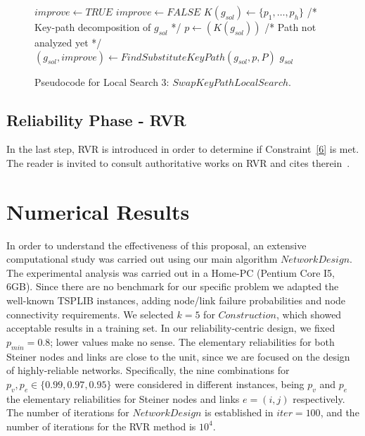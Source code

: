 \documentclass{llncs}
\begin{document}
\begin{figure}[H]
\begin{algorithm}[H]
\caption{$g_{sol} = SwapKeyPathLocalSearch(G_B,C,g_{sol},P)$}
\begin{algorithmic}[1]
\STATE $improve \leftarrow TRUE$
\STATE $improve \leftarrow FALSE$
\STATE $K(g_{sol}) \leftarrow \{p_1,\ldots,p_h\}$ /* Key-path decomposition of $g_{sol}$ */
\STATE $p \leftarrow(K(g_{sol}))$ /* Path not analyzed yet */
\STATE $(g_{sol},improve) \leftarrow FindSubstituteKeyPath(g_{sol},p,P)$
\ENDWHILE
\ENDWHILE
\RETURN $g_{sol}$
\end{algorithmic}
\end{algorithm}
\caption{Pseudocode for Local Search 3: $SwapKeyPathLocalSearch$.\label{alg-kpls2}}
\end{figure}

\subsection{Reliability Phase - RVR}
In the last step, RVR is introduced in order to determine if Constraint~\ref{6} is met. The reader is invited to consult authoritative works on RVR and cites therein~\cite{85}.  


\section{Numerical Results}\label{results}
In order to understand the effectiveness of this proposal, an extensive computational study was carried out using our main algorithm $NetworkDesign$. The experimental analysis was carried out in a Home-PC (Pentium Core I5, 6GB). Since there are no benchmark for our specific problem we adapted the well-known TSPLIB instances, adding node/link failure probabilities and node connectivity requirements. We selected $k=5$ for $Construction$, which showed acceptable results in a training set. In our reliability-centric design, we fixed $p_{min}=0.8$; lower values make no sense. The elementary reliabilities for both Steiner nodes and links are close to the unit, since we are focused on the design of highly-reliable networks. Specifically, the nine combinations for $p_{v},p_{e} \in \{0.99, 0.97,0.95\}$ were considered in different instances, being $p_v$ and $p_e$ the elementary reliabilities for Steiner nodes and links $e=(i,j)$ respectively. The number of iterations for $NetworkDesign$ is established in $iter=100$, and the number of iterations for the RVR method is $10^4$. 
\end{document}
